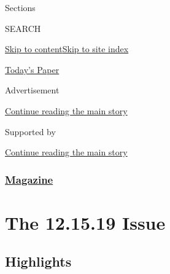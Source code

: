 Sections

SEARCH

\protect\hyperlink{site-content}{Skip to
content}\protect\hyperlink{site-index}{Skip to site index}

\href{https://myaccount.nytimes3xbfgragh.onion/auth/login?response_type=cookie\&client_id=vi}{}

\href{https://www.nytimes3xbfgragh.onion/section/todayspaper}{Today's
Paper}

Advertisement

\protect\hyperlink{after-top}{Continue reading the main story}

Supported by

\protect\hyperlink{after-sponsor}{Continue reading the main story}

\hypertarget{magazine}{%
\subsubsection{\texorpdfstring{\href{/section/magazine}{Magazine}}{Magazine}}\label{magazine}}

\hypertarget{the-121519-issue}{%
\section{The 12.15.19 Issue}\label{the-121519-issue}}

\hypertarget{highlights}{%
\subsection{Highlights}\label{highlights}}

